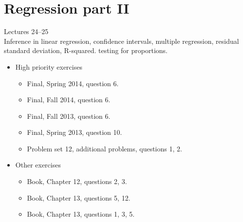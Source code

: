 \documentclass[11pt]{article}
\begin{document}
\section{Regression part II}
Lectures 24--25 \\[0.2in]
Inference in linear regression, confidence intervals, multiple regression, residual standard deviation, R-squared.
testing for proportions.
\begin{itemize}
	\item High priority exercises
		\begin{itemize}
			\item Final, Spring 2014, question 6.
			\item Final, Fall 2014, question 6.
			\item Final, Fall 2013, question 6.
			\item Final, Spring 2013, question 10.
			\item Problem set 12, additional problems, questions 1, 2.
		\end{itemize}
	\item Other exercises
	\begin{itemize}
		\item Book, Chapter 12, questions 2, 3.
		\item Book, Chapter 13, questions 5, 12.
		\item Book, Chapter 13, questions 1, 3, 5. 
	\end{itemize}
\end{itemize}



\end{document}
